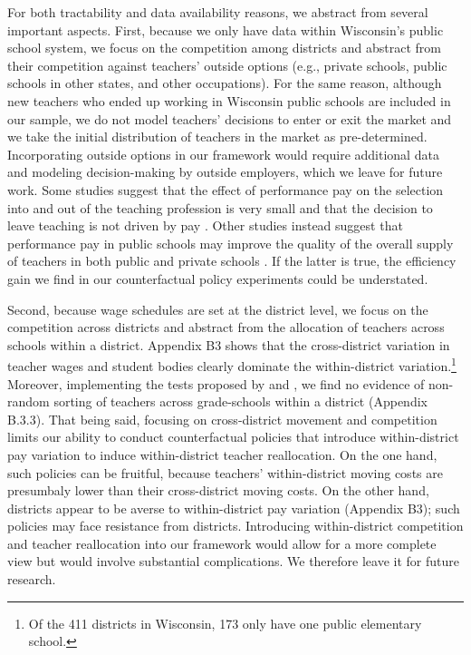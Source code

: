 \documentclass[notitlepage,12pt]{article}%
\begin{document}
For both tractability and data availability reasons, we abstract from several
important aspects. First, because we only have data within Wisconsin's public
school system, we focus on the competition among districts and abstract from
their competition against teachers' outside options (e.g., private schools,
public schools in other states, and other occupations). For the same reason,
although new teachers who ended up working in Wisconsin public schools are
included in our sample, we do not model teachers' decisions to enter or exit
the market and we take the initial distribution of teachers in the market as
pre-determined. Incorporating outside options in our framework would require
additional data and modeling decision-making by outside employers, which we
leave for future work. Some studies suggest that the effect of performance pay
on the selection into and out of the teaching profession is very small
\citep[e.g.,][]{rothstein2015teacher} and that the decision to leave teaching
is not driven by pay \citep{scafidi2006teachers}. Other studies instead
suggest that performance pay in public schools may improve the quality of the
overall supply of teachers in both public and private schools
\citep[e.g.,][]{tincani2020teacher}. If the latter is true, the efficiency
gain we find in our counterfactual policy experiments could be understated.

Second, because wage schedules are set at the district level, we focus on the
competition across districts and abstract from the allocation of teachers
across schools within a district. Appendix B3 shows that the
cross-district variation in teacher wages and student bodies clearly dominate
the within-district variation.\footnote{Of the 411 districts in Wisconsin, 173
only have one public elementary school.} Moreover, implementing the tests
proposed by \citet{chetty2014measuring} and \citet{rothstein2010teacher}, we
find no evidence of non-random sorting of teachers across grade-schools within
a district (Appendix B.3.3). That being said, focusing on
cross-district movement and competition limits our ability to conduct
counterfactual policies that introduce within-district pay variation to induce
within-district teacher reallocation. On the one hand, such policies can be
fruitful, because teachers' within-district moving costs are presumbaly lower
than their cross-district moving costs. On the other hand, districts appear to
be averse to within-district pay variation (Appendix B3); such policies
may face resistance from districts. Introducing within-district competition
and teacher reallocation into our framework would allow for a more complete
view but would involve substantial complications. We therefore leave it for
future research.
\end{document}
